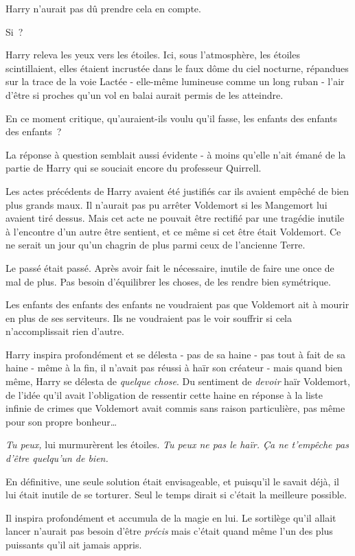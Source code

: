 Harry n'aurait pas dû prendre cela en compte.

Si~?

Harry releva les yeux vers les étoiles. Ici, sous l'atmosphère, les étoiles scintillaient, elles étaient incrustée dans le faux dôme du ciel nocturne, répandues sur la trace de la voie Lactée - elle-même lumineuse comme un long ruban - l'air d'être si proches qu'un vol en balai aurait permis de les atteindre.

En ce moment critique, qu'auraient-ils voulu qu'il fasse, les enfants des enfants des enfants~?

La réponse à question semblait aussi évidente - à moins qu'elle n'ait émané de la partie de Harry qui se souciait encore du professeur Quirrell.

Les actes précédents de Harry avaient été justifiés car ils avaient empêché de bien plus grands maux. Il n'aurait pas pu arrêter Voldemort si les Mangemort lui avaient tiré dessus. Mais cet acte ne pouvait être rectifié par une tragédie inutile à l'encontre d'un autre être sentient, et ce même si cet être était Voldemort. Ce ne serait un jour qu'un chagrin de plus parmi ceux de l'ancienne Terre.

Le passé était passé. Après avoir fait le nécessaire, inutile de faire une once de mal de plus. Pas besoin d'équilibrer les choses, de les rendre bien symétrique.

Les enfants des enfants des enfants ne voudraient pas que Voldemort ait à mourir en plus de ses serviteurs. Ils ne voudraient pas le voir souffrir si cela n'accomplissait rien d'autre.

Harry inspira profondément et se délesta - pas de sa haine - pas tout à fait de sa haine - même à la fin, il n'avait pas réussi à haïr son créateur - mais quand bien même, Harry se délesta de \emph{quelque chose}. Du sentiment de \emph{devoir} haïr Voldemort, de l'idée qu'il avait l'obligation de ressentir cette haine en réponse à la liste infinie de crimes que Voldemort avait commis sans raison particulière, pas même pour son propre bonheur…

\emph{Tu peux,} lui murmurèrent les étoiles. \emph{Tu peux ne pas le haïr. Ça ne t'empêche pas d'être quelqu'un de bien.}

En définitive, une seule solution était envisageable, et puisqu'il le savait déjà, il lui était inutile de se torturer. Seul le temps dirait si c'était la meilleure possible.

Il inspira profondément et accumula de la magie en lui. Le sortilège qu'il allait lancer n'aurait pas besoin d'être \emph{précis} mais c'était quand même l'un des plus puissants qu'il ait jamais appris.

